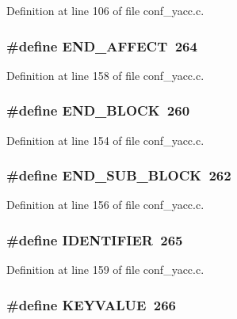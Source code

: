 Definition at line 106 of file conf\_\-yacc.c.
\subsubsection[{END\_\-AFFECT}]{\setlength{\rightskip}{0pt plus 5cm}\#define END\_\-AFFECT~264}\label{conf__yacc_8c_a118bfcf86c66a3e14247675e6eb0e336}


Definition at line 158 of file conf\_\-yacc.c.
\subsubsection[{END\_\-BLOCK}]{\setlength{\rightskip}{0pt plus 5cm}\#define END\_\-BLOCK~260}\label{conf__yacc_8c_a1e33ae802796dae8694948b87ac62d61}


Definition at line 154 of file conf\_\-yacc.c.
\subsubsection[{END\_\-SUB\_\-BLOCK}]{\setlength{\rightskip}{0pt plus 5cm}\#define END\_\-SUB\_\-BLOCK~262}\label{conf__yacc_8c_a73651ad88c3904ffeed68fc6d15c88ff}


Definition at line 156 of file conf\_\-yacc.c.
\subsubsection[{IDENTIFIER}]{\setlength{\rightskip}{0pt plus 5cm}\#define IDENTIFIER~265}\label{conf__yacc_8c_a45734d64ac1283048289925ad7b30dfe}


Definition at line 159 of file conf\_\-yacc.c.
\subsubsection[{KEYVALUE}]{\setlength{\rightskip}{0pt plus 5cm}\#define KEYVALUE~266}\label{conf__yacc_8c_a15956324a82088a2f23c936061145a97}


